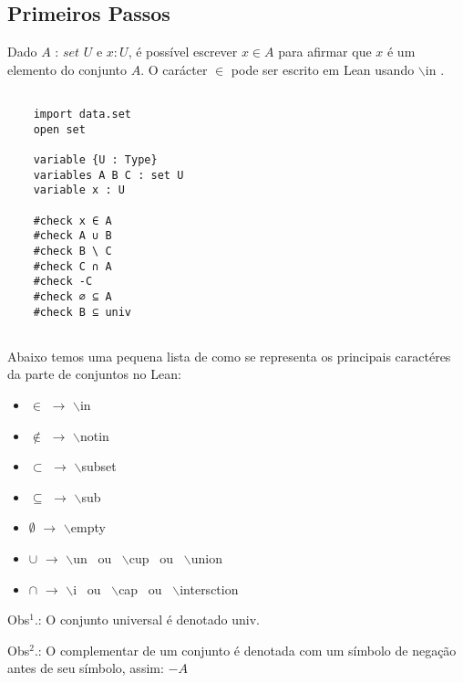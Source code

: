 \subsection{Primeiros Passos}
    Dado $A$ : $set$ $U$ e $x : U$, é possível escrever $x \in A$ para afirmar que $x$ é um elemento do conjunto $A$. O carácter $\in$ pode ser escrito em Lean usando $\backslash$in .
    

\begin{lstlisting}

    import data.set
    open set

    variable {U : Type}
    variables A B C : set U
    variable x : U

    #check x ∈ A
    #check A ∪ B
    #check B \ C
    #check C ∩ A
    #check -C
    #check ∅ ⊆ A
    #check B ⊆ univ
    
\end{lstlisting}


Abaixo temos uma pequena lista de como se representa os principais caractéres da parte de conjuntos no Lean: 

\begin{itemize}

  
    \item $\in$ $\rightarrow$ $\backslash$in
  
    \item $\notin$ $\rightarrow$ $\backslash$notin
  
    \item $\subset$ $\rightarrow$ $\backslash$subset
  
    \item $\subseteq$ $\rightarrow$ $\backslash$sub
  
    \item $\emptyset$ $\rightarrow$ $\backslash$empty
  
    \item $\cup$ $\rightarrow$ $\backslash$un \ ou \ $\backslash$cup \ ou \ $\backslash$union
  
    \item $\cap$ $\rightarrow$ $\backslash$i \ ou \ $\backslash$cap \ ou \ $\backslash$intersction

\end{itemize}

Obs$^{1}$.: O conjunto universal é denotado {
\selectfont univ}.

Obs$^{2}$.: O complementar de um conjunto é denotada com um símbolo de negação antes de seu símbolo, assim: $-A$

